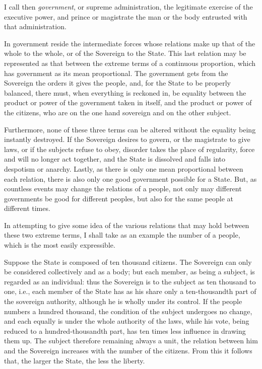 \documentclass[12pt]{report}
\begin{document}
I call then \textit{government}, or supreme administration, the legitimate exercise of the executive power, and prince or magistrate the man or the body entrusted with that administration.

In government reside the intermediate forces whose relations make up that of the whole to the whole, or of the Sovereign to the State. This last relation may be represented as that between the extreme terms of a continuous proportion, which has government as its mean proportional. The government gets from the Sovereign the orders it gives the people, and, for the State to be properly balanced, there must, when everything is reckoned in, be equality between the product or power of the government taken in itself, and the product or power of the citizens, who are on the one hand sovereign and on the other subject.

Furthermore, none of these three terms can be altered without the equality being instantly destroyed. If the Sovereign desires to govern, or the magistrate to give laws, or if the subjects refuse to obey, disorder takes the place of regularity, force and will no longer act together, and the State is dissolved and falls into despotism or anarchy. Lastly, as there is only one mean proportional between each relation, there is also only one good government possible for a State. But, as countless events may change the relations of a people, not only may different governments be good for different peoples, but also for the same people at different times.

In attempting to give some idea of the various relations that may hold between these two extreme terms, I shall take as an example the number of a people, which is the most easily expressible.

Suppose the State is composed of ten thousand citizens. The Sovereign can only be considered collectively and as a body; but each member, as being a subject, is regarded as an individual: thus the Sovereign is to the subject as ten thousand to one, i.e., each member of the State has as his share only a ten-thousandth part of the sovereign authority, although he is wholly under its control. If the people numbers a hundred thousand, the condition of the subject undergoes no change, and each equally is under the whole authority of the laws, while his vote, being reduced to a hundred-thousandth part, has ten times less influence in drawing them up. The subject therefore remaining always a unit, the relation between him and the Sovereign increases with the number of the citizens. From this it follows that, the larger the State, the less the liberty.
\end{document}

